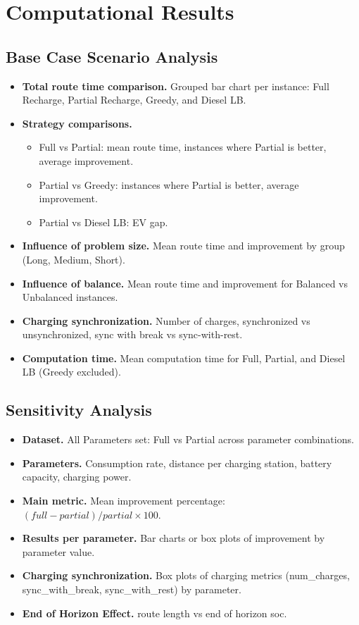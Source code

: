 \documentclass[trsc,dblanonrev]{informs4}
\begin{document}
\section{Computational Results} \label{sec:Computational Results}

\subsection{Base Case Scenario Analysis}
\begin{itemize}
    \item \textbf{Total route time comparison.} Grouped bar chart per instance: Full Recharge, Partial Recharge, Greedy, and Diesel LB.
    \item \textbf{Strategy comparisons.}
    \begin{itemize}
        \item Full vs Partial: mean route time, instances where Partial is better, average improvement.
        \item Partial vs Greedy: instances where Partial is better, average improvement.
        \item Partial vs Diesel LB: EV gap.
    \end{itemize}
    \item \textbf{Influence of problem size.} Mean route time and improvement by group (Long, Medium, Short).
    \item \textbf{Influence of balance.} Mean route time and improvement for Balanced vs Unbalanced instances.
    \item \textbf{Charging synchronization.} Number of charges, synchronized vs unsynchronized, sync with break vs sync-with-rest.
    \item \textbf{Computation time.} Mean computation time for Full, Partial, and Diesel LB (Greedy excluded).
\end{itemize}

\subsection{Sensitivity Analysis}
\begin{itemize}
    \item \textbf{Dataset.} All Parameters set: Full vs Partial across parameter combinations.
    \item \textbf{Parameters.} Consumption rate, distance per charging station, battery capacity, charging power.
    \item \textbf{Main metric.} Mean improvement percentage: $(full - partial) / partial \times 100$.
    \item \textbf{Results per parameter.} Bar charts or box plots of improvement by parameter value.
    \item \textbf{Charging synchronization.} Box plots of charging metrics (num\_charges, sync\_with\_break, sync\_with\_rest) by parameter.
    \item \textbf{End of Horizon Effect.} route length vs end of horizon soc.
\end{itemize}
\end{document}
